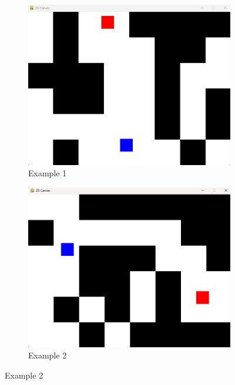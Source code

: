 \begin{figure}[htbp]
  \centering
  \begin{subfigure}{0.45\textwidth}
      \centering
      \includegraphics[width=0.8\linewidth]{assets/early-work/obs-gen1.png}
      \caption{Example 1}
  \end{subfigure}%
  \hfill
  \begin{subfigure}{0.45\textwidth}
      \centering
      \includegraphics[width=0.8\linewidth]{assets/early-work/obs-gen2.png}
      \caption{Example 2}
  \end{subfigure}

  \vspace{0.5cm}


\end{figure}
